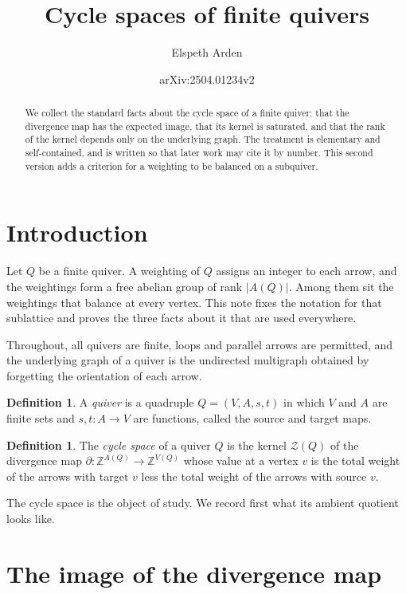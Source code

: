 \documentclass[11pt]{article}
\title{Cycle spaces of finite quivers}
\author{Elspeth Arden}
\date{arXiv:2504.01234v2}
\theoremstyle{plain}
\theoremstyle{definition}
\newtheorem{definition}[theorem]{Definition}
\theoremstyle{remark}
\newcommand{\ZZ}{\mathbb{Z}}
\newcommand{\Zc}{\mathcal{Z}}
\begin{document}
\maketitle

\begin{abstract}
We collect the standard facts about the cycle space of a finite quiver: that the divergence map has the expected image, that its kernel is saturated, and that the rank of the kernel depends only on the underlying graph. The treatment is elementary and self-contained, and is written so that later work may cite it by number. This second version adds a criterion for a weighting to be balanced on a subquiver.
\end{abstract}

\section{Introduction}

Let $Q$ be a finite quiver. A weighting of $Q$ assigns an integer to each arrow, and the weightings form a free abelian group of rank $|A(Q)|$. Among them sit the weightings that balance at every vertex. This note fixes the notation for that sublattice and proves the three facts about it that are used everywhere.

Throughout, all quivers are finite, loops and parallel arrows are permitted, and the underlying graph of a quiver is the undirected multigraph obtained by forgetting the orientation of each arrow.

\begin{definition}\label{def:quiver}
A \emph{quiver} is a quadruple $Q = (V, A, s, t)$ in which $V$ and $A$ are finite sets and $s, t \colon A \to V$ are functions, called the source and target maps.
\end{definition}

\begin{definition}\label{def:cycle-space}
The \emph{cycle space} of a quiver $Q$ is the kernel $\Zc(Q)$ of the divergence map $\partial \colon \ZZ^{A(Q)} \to \ZZ^{V(Q)}$ whose value at a vertex $v$ is the total weight of the arrows with target $v$ less the total weight of the arrows with source $v$.
\end{definition}

The cycle space is the object of study. We record first what its ambient quotient looks like.

\section{The image of the divergence map}
\end{document}
